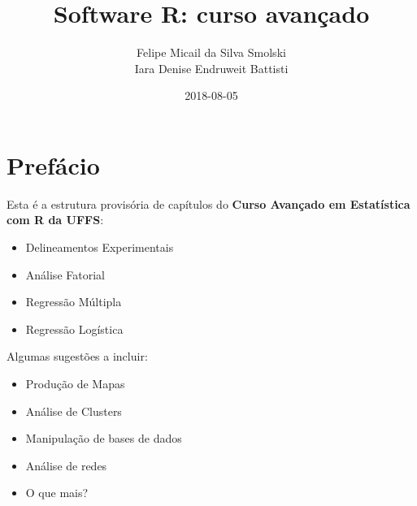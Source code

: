 \documentclass[12pt,brazil,oneside]{book}
\title{Software R: curso avançado}
\author{Felipe Micail da Silva Smolski \\ Iara Denise Endruweit Battisti}
\date{2018-08-05}
\providecommand{\tightlist}{%
  \setlength{\itemsep}{0pt}\setlength{\parskip}{0pt}}
\begin{document}
\maketitle

{
\setcounter{tocdepth}{1}
\tableofcontents
}
\hypertarget{prefacio}{%
\chapter*{Prefácio}\label{prefacio}}

Esta é a estrutura provisória de capítulos do \textbf{Curso Avançado em
Estatística com R da UFFS}:

\begin{itemize}
\tightlist
\item
  Delineamentos Experimentais
\item
  Análise Fatorial
\item
  Regressão Múltipla
\item
  Regressão Logística
\end{itemize}

Algumas sugestões a incluir:

\begin{itemize}
\tightlist
\item
  Produção de Mapas
\item
  Análise de Clusters
\item
  Manipulação de bases de dados
\item
  Análise de redes
\item
  O que mais?
\end{itemize}
\end{document}
